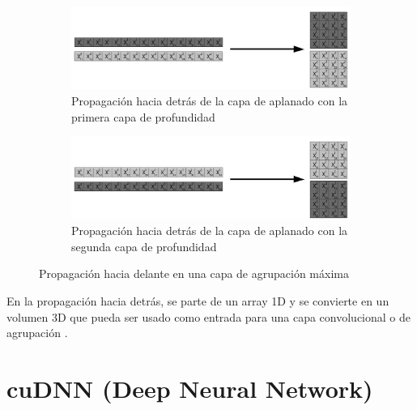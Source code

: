 \begin{figure}[H]
	\centering
	\begin{subfigure}{.5\textwidth}
		\hspace{-30mm}
		\includegraphics[width=2\linewidth]{imagenes/back_flatten_1.jpg}  
		\caption{Propagación hacia detrás de la capa de aplanado con la primera capa de profundidad}
	\end{subfigure}
	\begin{subfigure}{.5\textwidth}
		\hspace{-30mm}
		\includegraphics[width=2\linewidth]{imagenes/back_flatten_2.jpg}  
		\caption{Propagación hacia detrás de la capa de aplanado con la segunda capa de profundidad}
	\end{subfigure}
	
	\caption{Propagación hacia delante en una capa de agrupación máxima}
	\label{fig:back_prop_flatten_canales_profundidad}
\end{figure}

En la propagación hacia detrás, se parte de un array 1D y se convierte en un volumen 3D que pueda ser usado como entrada para una capa convolucional o de agrupación
\cite{flatten_forward}.

\section{cuDNN (Deep Neural Network)}

